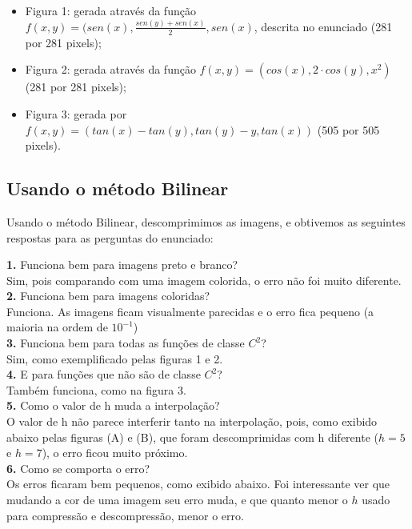 \documentclass[12pt,letterpaper]{article}
\begin{document}
	\begin{itemize}
		\item Figura 1: gerada através da função
		$f(x,y) = (sen(x), \frac{sen(y)+sen(x)}{2}, sen(x)$, descrita no enunciado (281 por 281 pixels);
		\item Figura 2: gerada através da função $f(x,y) = (cos(x), 2\cdot cos(y), x^2)$ (281 por 281 pixels);
		\item Figura 3: gerada por $f(x,y) = (tan(x) - tan(y), tan(y)- y, tan(x))$ (505 por 505 pixels).
	\end{itemize}
	
	\clearpage
	
	\subsection{Usando o método Bilinear}
	
	Usando o método Bilinear, descomprimimos as imagens, e obtivemos as seguintes respostas para as perguntas do enunciado:
	
	\textbf{1.} Funciona bem para imagens preto e branco?\\
	Sim, pois comparando com uma imagem colorida, o erro não foi muito diferente.\\
	
	\textbf{2.} Funciona bem para imagens coloridas?\\
	Funciona. As imagens ficam visualmente parecidas e o erro fica pequeno (a maioria na ordem de $10^{-1}$)\\
	
	\textbf{3.} Funciona bem para todas as funções de classe $C^2$?\\
	Sim, como exemplificado pelas figuras 1 e 2.\\
	
	\textbf{4.} E para funções que não são de classe $C^2$? \\
	Também funciona, como na figura 3.\\
	
	\textbf{5.} Como o valor de h muda a interpolação? \\
	O valor de h não parece interferir tanto na interpolação, pois, como exibido abaixo pelas figuras (A) e (B), que foram descomprimidas com h diferente ($h = 5$ e $h = 7$), o erro ficou muito próximo.\\
	
	\textbf{6.} Como se comporta o erro?\\
	Os erros ficaram bem pequenos, como exibido abaixo. Foi interessante ver que mudando a cor de uma imagem seu erro muda, e que quanto menor o $h$ usado para compressão e descompressão, menor o erro. \\
	
\end{document}
